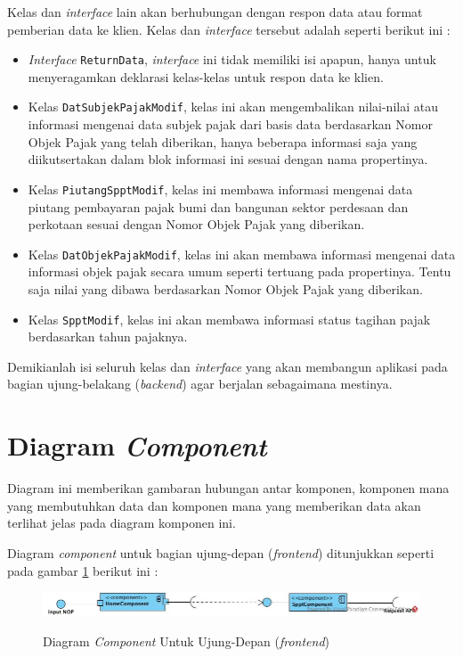 Kelas dan \textit{interface} lain akan berhubungan dengan respon data atau format pemberian data ke klien. Kelas dan \textit{interface} tersebut adalah seperti berikut ini :

\begin{itemize}
	\item \textit{Interface} \texttt{ReturnData}, \textit{interface} ini tidak memiliki isi apapun, hanya untuk menyeragamkan deklarasi kelas-kelas untuk respon data ke klien.
	\item Kelas \texttt{DatSubjekPajakModif}, kelas ini akan mengembalikan nilai-nilai atau informasi mengenai data subjek pajak dari basis data berdasarkan Nomor Objek Pajak yang telah diberikan, hanya beberapa informasi saja yang diikutsertakan dalam blok informasi ini sesuai dengan nama propertinya.
	\item Kelas \texttt{PiutangSpptModif}, kelas ini membawa informasi mengenai data piutang pembayaran pajak bumi dan bangunan sektor perdesaan dan perkotaan sesuai dengan Nomor Objek Pajak yang diberikan.
	\item Kelas \texttt{DatObjekPajakModif}, kelas ini akan membawa informasi mengenai data informasi objek pajak secara umum seperti tertuang pada propertinya. Tentu saja nilai yang dibawa berdasarkan Nomor Objek Pajak yang diberikan.
	\item Kelas \texttt{SpptModif}, kelas ini akan membawa informasi status tagihan pajak berdasarkan tahun pajaknya.
\end{itemize}

Demikianlah isi seluruh kelas dan \textit{interface} yang akan membangun aplikasi pada bagian ujung-belakang (\textit{backend}) agar berjalan sebagaimana mestinya.

\section{Diagram \textit{Component}}

Diagram ini memberikan gambaran hubungan antar komponen, komponen mana yang membutuhkan data dan komponen mana yang memberikan data akan terlihat jelas pada diagram komponen ini.

Diagram \textit{component} untuk bagian ujung-depan (\textit{frontend}) ditunjukkan seperti pada gambar \ref{fig:comp-dia-fe} berikut ini :

\begin{figure}[H]
	\centering
	\includegraphics[width=1\textwidth]{./resources/uml/component-diagram-fe}
	\label{fig:comp-dia-fe}
	\caption{Diagram \textit{Component} Untuk Ujung-Depan (\textit{frontend})}
\end{figure}

